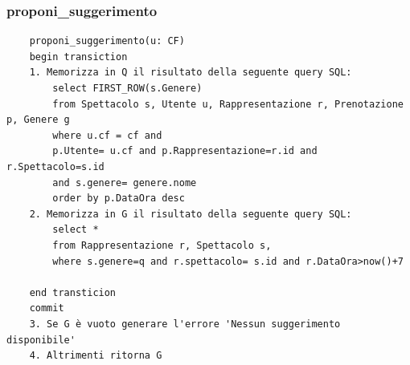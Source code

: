 \documentclass[12pt, letterpaper]{article}
\begin{document}
\subsubsection{proponi\_suggerimento}
\begin{verbatim}
    proponi_suggerimento(u: CF)
    begin transiction
    1. Memorizza in Q il risultato della seguente query SQL:
        select FIRST_ROW(s.Genere)
        from Spettacolo s, Utente u, Rappresentazione r, Prenotazione p, Genere g
        where u.cf = cf and 
        p.Utente= u.cf and p.Rappresentazione=r.id and r.Spettacolo=s.id
        and s.genere= genere.nome
        order by p.DataOra desc
    2. Memorizza in G il risultato della seguente query SQL:
        select *
        from Rappresentazione r, Spettacolo s, 
        where s.genere=q and r.spettacolo= s.id and r.DataOra>now()+7

    end transticion
    commit
    3. Se G è vuoto generare l'errore 'Nessun suggerimento disponibile'
    4. Altrimenti ritorna G

\end{verbatim}
\end{document}
